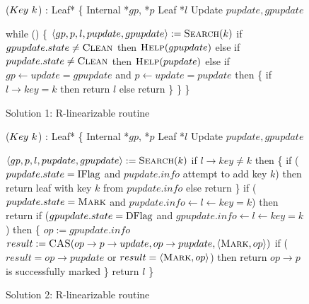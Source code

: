

\begin{figure*}[h]
	\footnotesize
	
	\begin{code}
		($Key\ k$) : Leaf* \{ \nlc
		\n Internal *$gp$, *$p$\nlc
		Leaf *$l$\nlc
		Update $pupdate, gpupdate$\bl
		\nlc
		
		while (\TRUE) \{ \nlc \n
		$\langle gp, p, l, pupdate, gpupdate \rangle := \mbox{\sc Search}(k)$\nlc
		if $gpupdate.state \neq \mbox{\sc Clean}$ then $\mbox{\sc Help}(gpupdate)$ \nlc
		else if $pupdate.state \neq \mbox{\sc Clean}$ then $\mbox{\sc Help}(pupdate)$ \nlc
		else if $gp \leftarrow update = gpupdate$ and $p \leftarrow update = pupdate$ then \{ \nlc \n
		if $l \rightarrow key = k$ then return $l$ \nlc
		else return \NULL \nlc
		\p \} \nlc
		\p \} \nlc
		\p \}
	\end{code}
	
	\caption{Solution 1: R-linearizable  routine}
	\label{robust find - solution 1}
\end{figure*}



\begin{figure*}[h]
	\footnotesize
	
	\begin{code}
		($Key\ k$) : Leaf* \{ \nlc
			\n Internal *$gp$, *$p$\nlc
			Leaf *$l$\nlc
			Update $pupdate, gpupdate$\bl
			\nlc
			
			$\langle gp, p, l, pupdate, gpupdate \rangle := \mbox{\sc Search}(k)$\nlc
			if $l\rightarrow key \neq k$ then \{ \nlc
				\n if ($pupdate.state = \mbox{IFlag}$ and $pupdate.info$ attempt to add key $k$) then \nlc
					\n return leaf with key $k$ from $pupdate.info$ \nlc \p
				else return \NULL \nlc \p
			\} \nlc
			if ($pupdate.state = \mbox{\sc Mark}$ and $pupdate.info \leftarrow l \leftarrow key = k$) then return \NULL \nlc
			if ($gpupdate.state = \mbox{DFlag}$ and $gpupdate.info \leftarrow l \leftarrow key = k$) then \{ \nlc
				\n $op := gpupdate.info$ \nlc
				$result := \mbox{\sc CAS}(op\rightarrow p\rightarrow update, op\rightarrow pupdate, \langle \mbox{\sc Mark}, op\rangle)$ \label{mark-cas}\nlc     
				if ($result = op\rightarrow pupdate$ or $result = \langle \mbox{\sc Mark}, op\rangle$) then return \NULL \label{checkmark} \tabtabcom $op\rightarrow p$ is successfully marked \nlc \p
			\} \nlc
			return $l$ \nlc \p
		\}
	\end{code}

	\caption{Solution 2: R-linearizable  routine}
	\label{robust find - solution 2}
\end{figure*}




